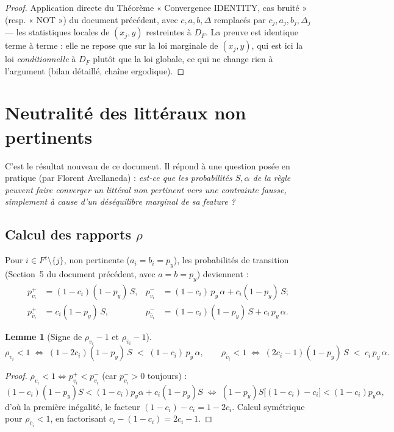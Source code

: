 \documentclass[12pt,a4paper]{article}
\newtheorem{lemma}[theorem]{Lemme}
\theoremstyle{remark}
\newcommand{\vbar}{\bar{v}}
\newcommand{\DF}{D_F}
\begin{document}
\begin{proof}
Application directe du Théorème « Convergence IDENTITY, cas bruité » (resp. « NOT »)
du document précédent, avec $c,a,b,\Delta$ remplacés par $c_j,a_j,b_j,\Delta_j$
--- les statistiques locales de $(x_j,y)$ restreintes à $\DF$. La preuve est
identique terme à terme : elle ne repose que sur la loi marginale de $(x_j,y)$, qui
est ici la loi \emph{conditionnelle} à $\DF$ plutôt que la loi globale, ce qui ne
change rien à l'argument (bilan détaillé, chaîne ergodique).
\end{proof}

\section{Neutralité des littéraux non pertinents}

C'est le résultat nouveau de ce document. Il répond à une question posée en
pratique (par Florent Avellaneda) : \emph{est-ce que les probabilités $S,\alpha$
de la règle peuvent faire converger un littéral non pertinent vers une contrainte
fausse, simplement à cause d'un déséquilibre marginal de sa feature ?}

\subsection{Calcul des rapports $\rho$}

Pour $i\in F^c\setminus\{j\}$, non pertinente ($a_i=b_i=p_y$), les probabilités de
transition (Section~5 du document précédent, avec $a=b=p_y$) deviennent :
\begin{align*}
  p^+_{v_i} &= (1-c_i)(1-p_y)\,S, &
  p^-_{v_i} &= (1-c_i)\,p_y\,\alpha + c_i(1-p_y)\,S; \\
  p^+_{\vbar_i} &= c_i(1-p_y)\,S, &
  p^-_{\vbar_i} &= (1-c_i)(1-p_y)\,S + c_i\,p_y\,\alpha.
\end{align*}

\begin{lemma}[Signe de $\rho_{v_i}-1$ et $\rho_{\vbar_i}-1$]\label{lem:signe_neutre}
\[
  \rho_{v_i} < 1
  \;\Longleftrightarrow\;
  (1-2c_i)(1-p_y)\,S \;<\; (1-c_i)\,p_y\,\alpha,
  \qquad
  \rho_{\vbar_i} < 1
  \;\Longleftrightarrow\;
  (2c_i-1)(1-p_y)\,S \;<\; c_i\,p_y\,\alpha.
\]
\end{lemma}

\begin{proof}
$\rho_{v_i}<1 \iff p^+_{v_i}<p^-_{v_i}$ (car $p^-_{v_i}>0$ toujours) :
\[
  (1-c_i)(1-p_y)S < (1-c_i)p_y\alpha + c_i(1-p_y)S
  \;\Longleftrightarrow\;
  (1-p_y)S\bigl[(1-c_i)-c_i\bigr] < (1-c_i)p_y\alpha,
\]
d'où la première inégalité, le facteur $(1-c_i)-c_i=1-2c_i$. Calcul symétrique pour
$\rho_{\vbar_i}<1$, en factorisant $c_i-(1-c_i)=2c_i-1$.
\end{proof}
\end{document}
